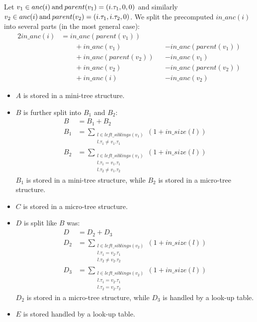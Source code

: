 Let $v_1 \in anc(i) \mathbin{\textrm{and}} parent(v_1) = (i.\tau_1, 0, 0)$ and similarly $v_2 \in anc(i) \mathbin{\textrm{and}} parent(v_2) = (i.\tau_1, i.\tau_2, 0)$.
We split the precomputed $in\_anc(i)$ into several parts (in the most general case):
\begin{alignat}{2}
	in\_anc(i) &=  in\_anc(parent(v_1)) \tag{A}\\
	&\qquad + in\_anc(v_1) &&- in\_anc(parent(v_1)) \tag{B}\\
	&\qquad + in\_anc(parent(v_2)) &&- in\_anc(v_1) \tag{C}\\
	&\qquad + in\_anc(v_2) &&- in\_anc(parent(v_2)) \tag{D}\\
	&\qquad + in\_anc(i) &&- in\_anc(v_2) \tag{E}
\end{alignat}

\begin{itemize}
	\item $A$ is stored in a mini-tree structure.
	\item $B$ is further split into $B_1$ and $B_2$:
	\begin{align*}
		B &= B_1 + B_2\\
		B_1 &= \sum_{\substack{l \in left\_siblings(v_1) \\ l.\tau_1 \ne v_1.\tau_1}} (1 + in\_size(l)) \\
		B_2 &= \sum_{\substack{l \in left\_siblings(v_1) \\ l.\tau_1 = v_1.\tau_1 \\ l.\tau_2 \ne v_1.\tau_2}} (1 + in\_size(l))
	\end{align*}
	$B_1$ is stored in a mini-tree structure, while $B_2$ is stored in a micro-tree structure.
	\item $C$ is stored in a micro-tree structure.
	\item $D$ is split like $B$ was:
	\begin{align*}
		D &= D_2 + D_3\\
		D_2 &= \sum_{\substack{l \in left\_siblings(v_2) \\ l.\tau_1 = v_2.\tau_1 \\ l.\tau_2 \ne v_2.\tau_2}} (1 + in\_size(l)) \\
		D_3 &= \sum_{\substack{l \in left\_siblings(v_2) \\ l.\tau_1 = v_2.\tau_1 \\ l.\tau_2 = v_2.\tau_2}} (1 + in\_size(l))
	\end{align*}
	$D_2$ is stored in a micro-tree structure, while $D_3$ is handled by a look-up table.
	\item $E$ is stored handled by a look-up table.
\end{itemize}


